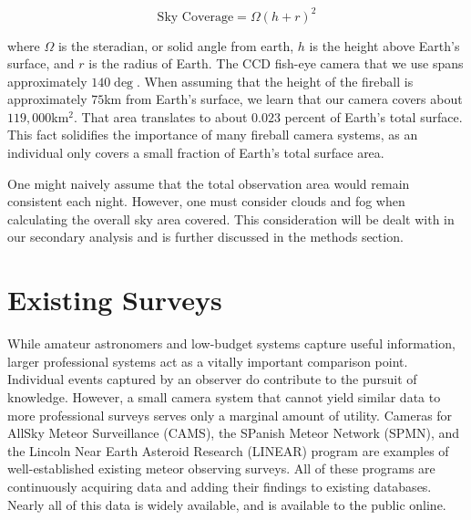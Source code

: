 \begin{equation}
\text{Sky Coverage} = \Omega(h+r)^2
\end{equation}

where $\Omega$ is the steradian, or solid angle from earth, $h$ is the height above Earth's surface, and $r$ is the radius of Earth. 
The CCD fish-eye camera that we use spans approximately $140\deg$.
When assuming that the height of the fireball is approximately $75$km from Earth's surface, we learn that our camera covers about $119,000$km$^2$.  
That area translates to about $0.023$ percent of Earth's total surface.
This fact solidifies the importance of many fireball camera systems, as an individual only covers a small fraction of Earth's total surface area.

One might naively assume that the total observation area would remain consistent each night.
However, one must consider clouds and fog when calculating the overall sky area covered.
This consideration will be dealt with in our secondary analysis and is further discussed in the methods section.


\section{Existing Surveys}
While amateur astronomers and low-budget systems capture useful information, larger professional systems act as a vitally important comparison point.
Individual events captured by an observer do contribute to the pursuit of knowledge.
However, a small camera system that cannot yield similar data to more professional surveys serves only a marginal amount of utility.
Cameras for AllSky Meteor Surveillance (CAMS), the SPanish Meteor Network (SPMN), and the Lincoln Near Earth Asteroid Research (LINEAR) program are examples of well-established existing meteor observing surveys.  
All of these programs are continuously acquiring data and adding their findings to existing databases.  
Nearly all of this data is widely available, and is available to the public online. 



